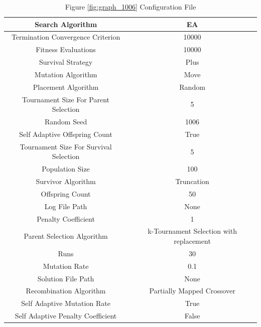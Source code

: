 \documentclass{standalone}
\begin{document}
\begin{table}[!htb]
	\centering
	\caption{Figure \ref{fig:graph_1006} Configuration File}
	\label{tab:graph_1006}
	\begin{tabular}{| c | c |}
		\hline
		Search Algorithm		& EA		 \\
		\hline
		Termination Convergence Criterion		& 10000		 \\
		\hline
		Fitness Evaluations		& 10000		 \\
		\hline
		Survival Strategy		& Plus		 \\
		\hline
		Mutation Algorithm		& Move		 \\
		\hline
		Placement Algorithm		& Random		 \\
		\hline
		Tournament Size For Parent Selection		& 5		 \\
		\hline
		Random Seed		& 1006		 \\
		\hline
		Self Adaptive Offspring Count		& True		 \\
		\hline
		Tournament Size For Survival Selection		& 5		 \\
		\hline
		Population Size		& 100		 \\
		\hline
		Survivor Algorithm		& Truncation		 \\
		\hline
		Offspring Count		& 50		 \\
		\hline
		Log File Path		& None		 \\
		\hline
		Penalty Coefficient		& 1		 \\
		\hline
		Parent Selection Algorithm		& k-Tournament Selection with replacement		 \\
		\hline
		Runs		& 30		 \\
		\hline
		Mutation Rate		& 0.1		 \\
		\hline
		Solution File Path		& None		 \\
		\hline
		Recombination Algorithm		& Partially Mapped Crossover		 \\
		\hline
		Self Adaptive Mutation Rate		& True		 \\
		\hline
		Self Adaptive Penalty Coefficient		& False		 \\
		\hline
	\end{tabular}
\end{table}
\end{document}

